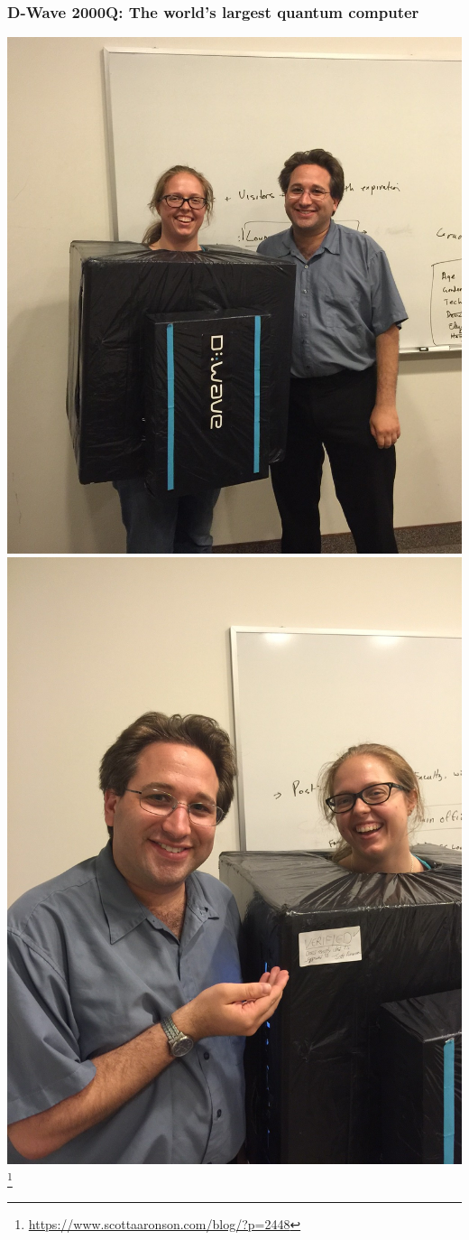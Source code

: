 \documentclass[notes]{beamer}
\begin{document}
\begin{frame}
\frametitle{D-Wave 2000Q: The world's largest quantum computer}

\begin{center}
\includegraphics[scale=0.15]{dwavecostume1}
\includegraphics[scale=0.1]{dwavecostume2}\footnote{\url{https://www.scottaaronson.com/blog/?p=2448}}

\end{center}
\end{frame}
\end{document}
